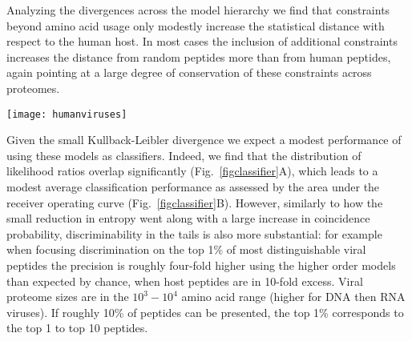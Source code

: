 \documentclass[superscriptaddress,twocolumn,pre]{revtex4}
\newcommand{\<}{\langle}
\renewcommand{\>}{\rangle}
\begin{document}
Analyzing the divergences across the model hierarchy we find that constraints beyond amino acid usage only modestly increase the statistical distance with respect to the human host. In most cases the inclusion of additional constraints increases the distance from random peptides more than from human peptides, again pointing at a large degree of conservation of these constraints across proteomes.

\begin{figure*}
    \begin{center}
    \texttt{[image: humanviruses]}
    \end{center}
    \caption{Performance of the models as classifiers. (A) Distributions of likelihood ratios for peptides from host and virus proteins. (B) Sensitivity-specificity tradeoff curve for various models. (C) Precision-recall characteristics at a 10-fold excess of self-peptides.
    \label{figclassifier}
    }
\end{figure*}

Given the small Kullback-Leibler divergence we expect a modest performance of using these models as classifiers. Indeed, we find that the distribution of likelihood ratios overlap significantly (Fig.~\ref{figclassifier}A), which leads to a modest average classification performance as assessed by the area under the receiver operating curve (Fig.~\ref{figclassifier}B). However, similarly to how the small reduction in entropy went along with a large increase in coincidence probability, discriminability in the tails is also more substantial: for example when focusing discrimination on the top 1\% of most distinguishable viral peptides the precision is roughly four-fold higher using the higher order models than expected by chance, when host peptides are in 10-fold excess. Viral proteome sizes are in the $10^3-10^4$ amino acid range (higher for DNA then RNA viruses). If roughly 10\% of peptides can be presented, the top 1\% corresponds to the top 1 to top 10 peptides.





\end{document}
